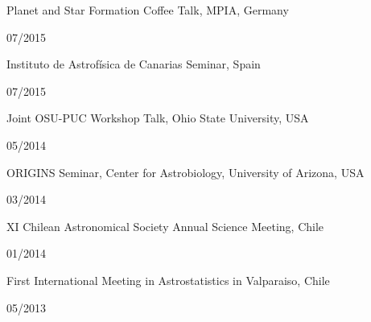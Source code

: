 \documentclass[12pt, a4paper]{article} %
\begin{document}
\begin{minipage}[t]{0.7\textwidth}
\begin{flushleft}%
  \setlength{\leftskip}{0.2cm}%
Planet and Star Formation Coffee Talk, MPIA, Germany
\end{flushleft}
\end{minipage}
\begin{minipage}[t]{0.3\textwidth}
\hfill 07/2015
\end{minipage}

\begin{minipage}[t]{0.7\textwidth}
\begin{flushleft}%
  \setlength{\leftskip}{0.2cm}%
Instituto de Astrof\'isica de Canarias Seminar, Spain
\end{flushleft}
\end{minipage}
\begin{minipage}[t]{0.3\textwidth}
\hfill 07/2015
\end{minipage}
\begin{minipage}[t]{0.7\textwidth}
\begin{flushleft}%
  \setlength{\leftskip}{0.2cm}%
Joint OSU-PUC Workshop Talk, Ohio State University, USA
\end{flushleft}
\end{minipage}
\begin{minipage}[t]{0.3\textwidth}
\hfill 05/2014
\end{minipage}

\begin{minipage}[t]{0.7\textwidth}
\begin{flushleft}%
  \setlength{\leftskip}{0.2cm}%
ORIGINS Seminar, Center for Astrobiology, University of Arizona, USA
\end{flushleft}
\end{minipage}
\begin{minipage}[t]{0.3\textwidth}
\hfill 03/2014
\end{minipage}

\begin{minipage}[t]{0.7\textwidth}
\begin{flushleft}%
  \setlength{\leftskip}{0.2cm}%
XI Chilean Astronomical Society Annual Science Meeting, Chile 
\end{flushleft}
\end{minipage}
\begin{minipage}[t]{0.3\textwidth}
\hfill 01/2014
\end{minipage}

\begin{minipage}[t]{0.7\textwidth}
\begin{flushleft}%
  \setlength{\leftskip}{0.2cm}%
First International Meeting in Astrostatistics in Valparaiso, Chile 
\end{flushleft}
\end{minipage}
\begin{minipage}[t]{0.3\textwidth}
\hfill 05/2013
\end{minipage}
\end{document}
